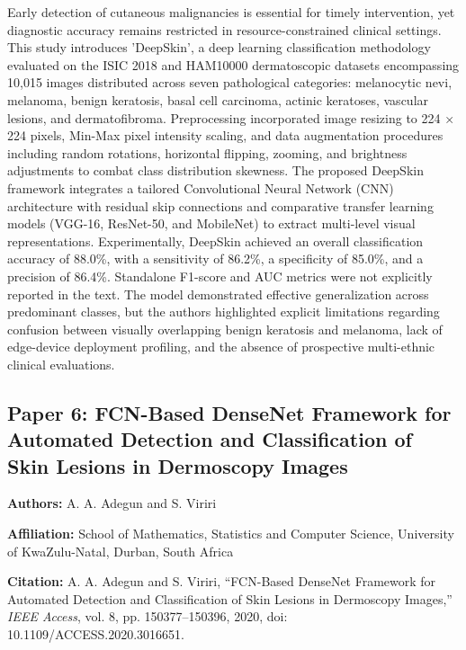 \documentclass[conference]{IEEEtran}
\begin{document}
Early detection of cutaneous malignancies is essential for timely intervention, yet diagnostic accuracy remains restricted in resource-constrained clinical settings. This study introduces 'DeepSkin', a deep learning classification methodology evaluated on the ISIC 2018 and HAM10000 dermatoscopic datasets encompassing 10,015 images distributed across seven pathological categories: melanocytic nevi, melanoma, benign keratosis, basal cell carcinoma, actinic keratoses, vascular lesions, and dermatofibroma. Preprocessing incorporated image resizing to 224 × 224 pixels, Min-Max pixel intensity scaling, and data augmentation procedures including random rotations, horizontal flipping, zooming, and brightness adjustments to combat class distribution skewness. The proposed DeepSkin framework integrates a tailored Convolutional Neural Network (CNN) architecture with residual skip connections and comparative transfer learning models (VGG-16, ResNet-50, and MobileNet) to extract multi-level visual representations. Experimentally, DeepSkin achieved an overall classification accuracy of 88.0\%, with a sensitivity of 86.2\%, a specificity of 85.0\%, and a precision of 86.4\%. Standalone F1-score and AUC metrics were not explicitly reported in the text. The model demonstrated effective generalization across predominant classes, but the authors highlighted explicit limitations regarding confusion between visually overlapping benign keratosis and melanoma, lack of edge-device deployment profiling, and the absence of prospective multi-ethnic clinical evaluations.

\subsection{Paper 6: FCN-Based DenseNet Framework for Automated Detection and Classification of Skin Lesions in Dermoscopy Images}

\textbf{Authors:} A. A. Adegun and S. Viriri

\textbf{Affiliation:} School of Mathematics, Statistics and Computer Science, University of KwaZulu-Natal, Durban, South Africa

\textbf{Citation:} A. A. Adegun and S. Viriri, ``FCN-Based DenseNet Framework for Automated Detection and Classification of Skin Lesions in Dermoscopy Images,'' \textit{IEEE Access}, vol. 8, pp. 150377--150396, 2020, doi: 10.1109/ACCESS.2020.3016651.
\end{document}
